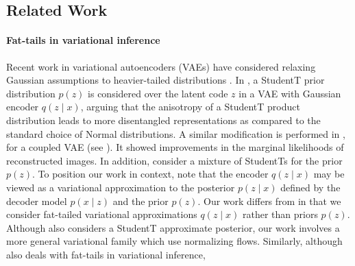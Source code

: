 \documentclass{article}
\theoremstyle{definition}
\theoremstyle{remark}
\begin{document}
\subsection*{Related Work}
\vspace{-1mm}
\paragraph{Fat-tails in variational inference}

Recent work in variational autoencoders (VAEs) have considered relaxing Gaussian assumptions to heavier-tailed distributions \citep{mathieu2019disentangling,chen2019residual,boenninghoff2020variational,abiri2020variational}.
In \citep{mathieu2019disentangling}, a StudentT prior distribution $p(z)$ is considered over the latent code
$z$ in a VAE with Gaussian encoder $q(z \mid x)$, arguing
that the anisotropy of a StudentT product distribution leads to more disentangled representations as compared to the standard choice of Normal distributions.
A similar modification is performed in \cite{chen2020use}, for
a coupled VAE (see \cite{cao2019coupled}). It showed improvements in the marginal
likelihoods of reconstructed images. In addition,
\cite{boenninghoff2020variational} consider a mixture of StudentTs for the
prior $p(z)$. To position
our work in context, note that the encoder $q(z \mid x)$ may be viewed
as a variational approximation to the posterior $p(z \mid x)$ defined by the
decoder model $p(x \mid z)$ and the prior $p(z)$. Our work differs from
\citep{mathieu2019disentangling,chen2020use,boenninghoff2020variational} in
that we consider fat-tailed variational approximations $q(z \mid x)$ rather
than priors $p(z)$. Although \citep{abiri2020variational} also considers
a StudentT approximate posterior, our work involves a more general
variational family which use normalizing flows.
Similarly, although \citep{wang2018variational} also deals with fat-tails in variational inference,
\end{document}
